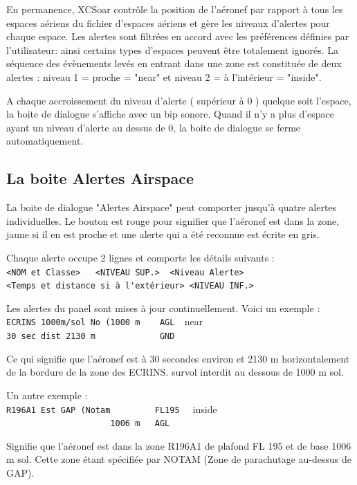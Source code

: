 En permanence, XCSoar contrôle la position de l'aéronef par rapport à tous les espaces aériens du fichier d'espaces aériens et gère les niveaux d'alertes pour chaque espace. Les alertes sont filtrées en accord avec les préférences définies par l'utilisateur: ainsi certains types d'espaces peuvent être totalement ignorés.
La séquence des évènements levés en entrant dans une zone est constituée de deux alertes : niveau 1 = proche = "near" et niveau 2 = à l'intérieur = "inside".

A chaque accroissement du niveau d'alerte ( supérieur à 0 ) quelque soit l'espace, la boite de dialogue s'affiche avec un bip sonore. Quand il n'y a plus d'espace ayant un niveau d'alerte au dessus de 0, la boite de dialogue se ferme automatiquement.

\subsection*{La boite Alertes Airspace}

La boite de dialogue "Alertes Airspace" peut comporter jusqu'à quatre alertes individuelles. Le bouton est rouge pour signifier que l'aéronef est dans la zone, jaune si il en est proche et une alerte qui a été reconnue est écrite en gris.

Chaque alerte occupe 2 lignes et comporte les détails suivants :\\ 
\verb+<NOM et Classe>   <NIVEAU SUP.>  <Niveau Alerte>+  \\
\verb+<Temps et distance si à l'extérieur> <NIVEAU INF.>+

Les alertes du panel sont mises à jour continuellement.
Voici un exemple :\\
\verb+ECRINS 1000m/sol No (1000 m    AGL  +\colorbox{AirspaceYellow}{near} \\
\verb+30 sec dist 2130 m             GND+

Ce qui signifie que l'aéronef est à 30 secondes environ et 2130 m horizontalement de la bordure de la zone des ECRINS. survol interdit au dessous de 1000 m sol.

Un autre exemple :\\
\verb+R196A1 Est GAP (Notam         FL195  + \colorbox{AirspaceRed}{inside}  \\
\verb+                     1006 m   AGL+

Signifie que l'aéronef est dans la zone R196A1 de plafond FL 195 et de base 1006 m sol. Cette zone étant spécifiée par NOTAM (Zone de parachutage au-dessus de GAP).

